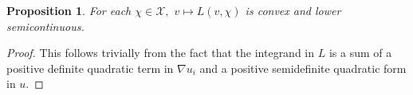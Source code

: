 \documentclass[11pt]{article}
\newtheorem{proposition}[theorem]{Proposition}
\begin{document}
\begin{proposition}
\label{lsc}
For each $\chi\in \mathcal{X},$ $v\mapsto L(v,\chi)$ is convex and lower semicontinuous.\end{proposition}
\begin{proof}
This follows trivially from the fact that the integrand in $L$ is a sum of a positive definite quadratic term in $\nabla u_i$ and a positive semidefinite quadratic form in $u$.

%
%
%
\end{proof}
\end{document}
